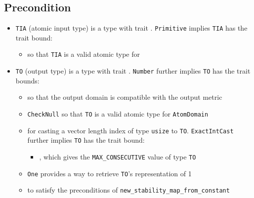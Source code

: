 \documentclass{article}
\begin{document}
\subsection*{Precondition}
\begin{itemize}

    \item \texttt{TIA} (atomic input type) is a type with trait . \texttt{Primitive} implies \texttt{TIA} has the trait bound:
    \begin{itemize}
        \item {} so that \texttt{TIA} is a valid atomic type for 
    \end{itemize}

    \item \texttt{TO} (output type) is a type with trait . \texttt{Number} further implies \texttt{TO} has the trait bounds:
    \begin{itemize}
        \item {} so that the output domain is compatible with the output metric
        \item \texttt{CheckNull} so that \texttt{TO} is a valid atomic type for \texttt{AtomDomain}
        \item {} for casting a vector length index of type \texttt{usize} to \texttt{TO}. \texttt{ExactIntCast} further implies \texttt{TO} has the trait bound:
        \begin{itemize}
            \item {}, which gives the \texttt{MAX\_CONSECUTIVE} value of type \texttt{TO}
        \end{itemize}
        
        \item \texttt{One} provides a way to retrieve \texttt{TO}'s representation of 1
        \item {} to satisfy the preconditions of \texttt{new\_stability\_map\_from\_constant}
    \end{itemize}
\end{itemize}
\end{document}
